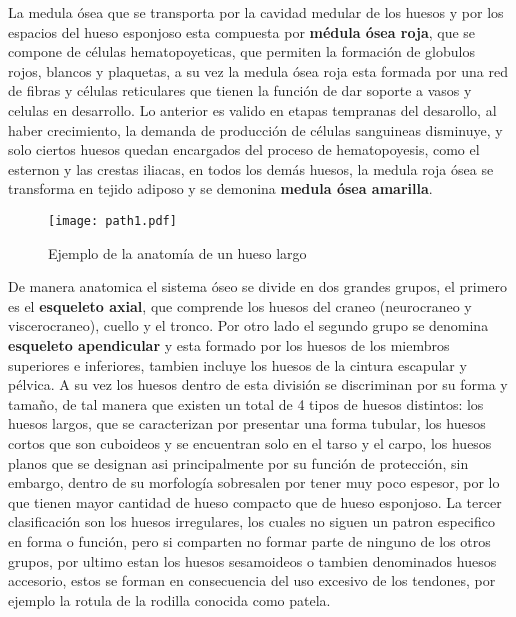 \documentclass[letterpaper,12pt,oneside]{book}
\begin{document}
    La medula ósea que se transporta por la cavidad medular de los huesos y por los espacios del hueso esponjoso esta compuesta por \textbf{médula ósea roja}, que se compone de células hematopoyeticas, que permiten la formación de globulos rojos, blancos y plaquetas, a su vez la medula ósea roja esta formada por una red de fibras y células reticulares que tienen la función de dar soporte a vasos y celulas en desarrollo. Lo anterior es valido en etapas tempranas del desarollo, al haber crecimiento, la demanda de producción de células sanguineas disminuye, y solo ciertos huesos quedan encargados del proceso de hematopoyesis, como el esternon y las crestas iliacas, en todos los demás huesos, la medula roja ósea se transforma en tejido adiposo y se demonina \textbf{medula ósea amarilla}.

    \vspace{10pt}


    \begin{figure}[h!]
        \centering
        \texttt{[image: path1.pdf]}
        \caption{Ejemplo de la anatomía de un hueso largo}
        \label{im1}
    \end{figure}

    \vspace{10pt}

    De manera anatomica el sistema óseo se divide en dos grandes grupos, el primero es el \textbf{esqueleto axial}, que comprende los huesos del craneo (neurocraneo y viscerocraneo), cuello y el tronco. Por otro lado el segundo grupo se denomina \textbf{esqueleto apendicular} y esta formado por los huesos de los miembros superiores e inferiores, tambien incluye los huesos de la cintura escapular y pélvica. A su vez los huesos dentro de esta división se discriminan por su forma y tamaño, de tal manera que existen un total de 4 tipos de huesos distintos: los huesos largos, que se caracterizan por presentar una forma tubular, los huesos cortos que son cuboideos y se encuentran solo en el tarso y el carpo, los huesos planos que se designan asi principalmente por su función de protección, sin embargo, dentro de su morfología sobresalen por tener muy poco espesor, por lo que tienen mayor cantidad de hueso compacto que de hueso esponjoso. La tercer clasificación son los huesos irregulares, los cuales no siguen un patron especifico en forma o función, pero si comparten no formar parte de ninguno de los otros grupos, por ultimo estan los huesos sesamoideos o tambien denominados huesos accesorio, estos se forman en consecuencia del uso excesivo de los tendones, por ejemplo la rotula de la rodilla conocida como patela. 
\end{document}
